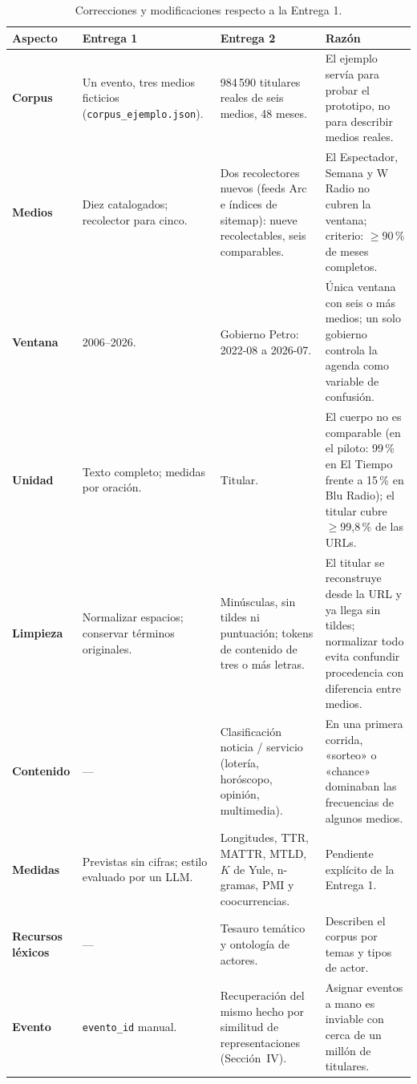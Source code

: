 \documentclass[10pt,twocolumn]{article}
\begin{document}
\begin{table}[t]
\centering\small
\caption{Correcciones y modificaciones respecto a la Entrega 1.}
\label{tab:cambios}
\begin{tabularx}{\textwidth}{>{\bfseries}p{2.3cm} Y Y Y}
\toprule
\textnormal{\textbf{Aspecto}} & \textbf{Entrega 1} & \textbf{Entrega 2} & \textbf{Razón}\\
\midrule
Corpus & Un evento, tres medios ficticios (\texttt{corpus\_ejemplo.json}). & 984\,590 titulares reales de seis medios, 48 meses. & El ejemplo servía para probar el prototipo, no para describir medios reales.\\
Medios & Diez catalogados; recolector para cinco. & Dos recolectores nuevos (feeds Arc e índices de sitemap): nueve recolectables, seis comparables. & El Espectador, Semana y W Radio no cubren la ventana; criterio: $\geq$90\,\% de meses completos.\\
Ventana & 2006--2026. & Gobierno Petro: 2022-08 a 2026-07. & Única ventana con seis o más medios; un solo gobierno controla la agenda como variable de confusión.\\
Unidad & Texto completo; medidas por oración. & Titular. & El cuerpo no es comparable (en el piloto: 99\,\% en El Tiempo frente a 15\,\% en Blu Radio); el titular cubre $\geq$99{,}8\,\% de las URLs.\\
Limpieza & Normalizar espacios; conservar términos originales. & Minúsculas, sin tildes ni puntuación; tokens de contenido de tres o más letras. & El titular se reconstruye desde la URL y ya llega sin tildes; normalizar todo evita confundir procedencia con diferencia entre medios.\\
Contenido & --- & Clasificación noticia / servicio (lotería, horóscopo, opinión, multimedia). & En una primera corrida, «sorteo» o «chance» dominaban las frecuencias de algunos medios.\\
Medidas & Previstas sin cifras; estilo evaluado por un LLM. & Longitudes, TTR, MATTR, MTLD, $K$ de Yule, n-gramas, PMI y coocurrencias. & Pendiente explícito de la Entrega 1.\\
Recursos léxicos & --- & Tesauro temático y ontología de actores. & Describen el corpus por temas y tipos de actor.\\
Evento & \texttt{evento\_id} manual. & Recuperación del mismo hecho por similitud de representaciones (Sección~IV). & Asignar eventos a mano es inviable con cerca de un millón de titulares.\\
\bottomrule
\end{tabularx}
\end{table}
\end{document}
